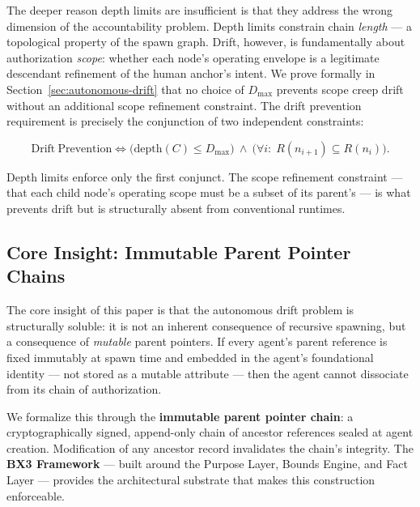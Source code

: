 The deeper reason depth limits are insufficient is that they address the wrong dimension of the accountability problem. Depth limits constrain chain \emph{length} — a topological property of the spawn graph. Drift, however, is fundamentally about authorization \emph{scope}: whether each node's operating envelope is a legitimate descendant refinement of the human anchor's intent. We prove formally in Section~\ref{sec:autonomous-drift} that no choice of $D_{\max}$ prevents scope creep drift without an additional scope refinement constraint. The drift prevention requirement is precisely the conjunction of two independent constraints:

\begin{equation}
\mathrm{Drift\ Prevention} \iff \bigl( \mathrm{depth}(C) \leq D_{\max} \bigr)\ \land\ \bigl( \forall i:\; R(n_{i+1}) \subseteq R(n_i) \bigr).
\label{eq:intro-drift-prevention}
\end{equation}

Depth limits enforce only the first conjunct. The scope refinement constraint — that each child node's operating scope must be a subset of its parent's — is what prevents drift but is structurally absent from conventional runtimes.

\subsection{Core Insight: Immutable Parent Pointer Chains}
\label{sec:intro-core-insight}

The core insight of this paper is that the autonomous drift problem is structurally soluble: it is not an inherent consequence of recursive spawning, but a consequence of \emph{mutable} parent pointers. If every agent's parent reference is fixed immutably at spawn time and embedded in the agent's foundational identity — not stored as a mutable attribute — then the agent cannot dissociate from its chain of authorization.

We formalize this through the \textbf{immutable parent pointer chain}: a cryptographically signed, append-only chain of ancestor references sealed at agent creation. Modification of any ancestor record invalidates the chain's integrity. The \textbf{BX3 Framework} — built around the Purpose Layer, Bounds Engine, and Fact Layer — provides the architectural substrate that makes this construction enforceable.

